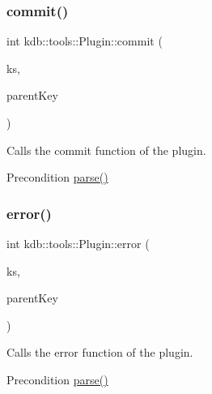 \subsubsection{\texorpdfstring{commit()}{commit()}}
{\footnotesize\ttfamily int kdb\+::tools\+::\+Plugin\+::commit (\begin{DoxyParamCaption}\item[{\hyperlink{classkdb_1_1KeySet}{kdb\+::\+Key\+Set} \&}]{ks,  }\item[{\hyperlink{classkdb_1_1Key}{kdb\+::\+Key} \&}]{parent\+Key }\end{DoxyParamCaption})}



Calls the commit function of the plugin. 

\begin{DoxyPrecond}{Precondition}
\hyperlink{classkdb_1_1tools_1_1Plugin_adfcba2fbdeb436a1083410df804d5fb0}{parse()} 
\end{DoxyPrecond}
\mbox{\label{classkdb_1_1tools_1_1Plugin_a8ec348b49a34ef17fda64cb289b8cf64}} 
\subsubsection{\texorpdfstring{error()}{error()}}
{\footnotesize\ttfamily int kdb\+::tools\+::\+Plugin\+::error (\begin{DoxyParamCaption}\item[{\hyperlink{classkdb_1_1KeySet}{kdb\+::\+Key\+Set} \&}]{ks,  }\item[{\hyperlink{classkdb_1_1Key}{kdb\+::\+Key} \&}]{parent\+Key }\end{DoxyParamCaption})}



Calls the error function of the plugin. 

\begin{DoxyPrecond}{Precondition}
\hyperlink{classkdb_1_1tools_1_1Plugin_adfcba2fbdeb436a1083410df804d5fb0}{parse()} 
\end{DoxyPrecond}
\mbox{\label{classkdb_1_1tools_1_1Plugin_a7911f8c46aea6fe4ec6fcb4788b77beb}} 
